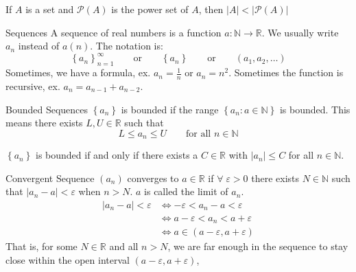\documentclass[12pt]{article}
\begin{document}
\begin{theorem}{}{}
    If $ A $ is a set and $ \mathcal{P} \left( A \right) $ is the power set of $ A $, then $ | A | < | \mathcal{P} \left( A \right) | $
\end{theorem}
\begin{definition}{Sequences}{}
    A sequence of real numbers is a function $ a: \mathbb{N} \to \mathbb{R} $. We usually write $ a_n $ instead of $ a \left( n \right) $. The notation is:
    \[ \left\{ a_n \right\}_{n = 1}^\infty \qquad \text{or} \qquad \left\{ a_n \right\} \qquad \text{or} \qquad \left( a_1, a_2, \dots \right) \]
    Sometimes, we have a formula, ex. $ a_n = \frac{1}{n} $ or $ a_n = n^2 $. Sometimes the function is recursive, ex. $ a_n = a_{n-1} + a_{n-2} $.
\end{definition}
\begin{definition}{Bounded Sequences}{}
    $ \left\{ a_n \right\} $ is bounded if the range $ \left\{ a_n : a \in \mathbb{N} \right\} $ is bounded. This means there exists $ L, U \in \mathbb{R} $ such that
    \[ L \leq a_n \leq U \qquad \text{for all } n \in \mathbb{N} \]
\end{definition}
\begin{proposition}{}{}
    $ \left\{ a_n \right\} $ is bounded if and only if there exists a $ C \in \mathbb{R} $ with $ | a_n | \leq C $ for all $ n \in \mathbb{N} $.
\end{proposition}
\begin{definition}{Convergent Sequence}{}
    $ \left( a_n \right) $ converges to $ a \in \mathbb{R} $ if $ \forall \; \varepsilon > 0 $ there exists $ N \in \mathbb{N} $ such that $ | a_n - a | < \varepsilon $ when $ n > N $. $ a $ is called the limit of $ a_n $.
    \begin{align*}
        | a_n - a | < \varepsilon & \Leftrightarrow - \varepsilon < a_n - a < \varepsilon \\
        & \Leftrightarrow a - \varepsilon < a_n < a + \varepsilon \\
        & \Leftrightarrow a \in \left( a - \varepsilon, a + \varepsilon \right)
    \end{align*}
    That is, for some $ N \in \mathbb{R} $ and all $ n > N $, we are far enough in the sequence to stay close within the open interval $ \left( a - \varepsilon, a + \varepsilon \right) $,
\end{definition}
\end{document}

